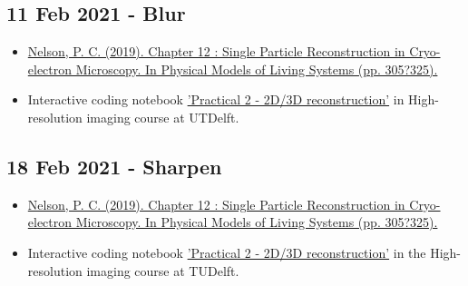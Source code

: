 \documentclass[11pt, oneside]{article}   	%
\begin{document}
\pagebreak
\subsection{11 Feb 2021 - Blur}
\begin{itemize}
	\item \href{https://repository.upenn.edu/cgi/viewcontent.cgi?article=1665&context=physics_papers}{Nelson, P. C. (2019). Chapter 12 : Single Particle Reconstruction in Cryo-electron Microscopy. In Physical Models of Living Systems (pp. 305?325).}
	\item Interactive coding notebook \href{https://gitlab.tudelft.nl/aj-lab/teaching/-/wikis/NB4020}{'Practical 2 - 2D/3D reconstruction'} in High-resolution imaging course at UTDelft.
\end{itemize}

\subsection{18 Feb 2021 - Sharpen}
\begin{itemize}
	\item \href{https://repository.upenn.edu/cgi/viewcontent.cgi?article=1665&context=physics_papers}{Nelson, P. C. (2019). Chapter 12 : Single Particle Reconstruction in Cryo-electron Microscopy. In Physical Models of Living Systems (pp. 305?325).}
	\item Interactive coding notebook \href{https://gitlab.tudelft.nl/aj-lab/teaching/-/wikis/NB4020}{'Practical 2 - 2D/3D reconstruction'} in the High-resolution imaging course at TUDelft.
\end{itemize}
\end{document}
